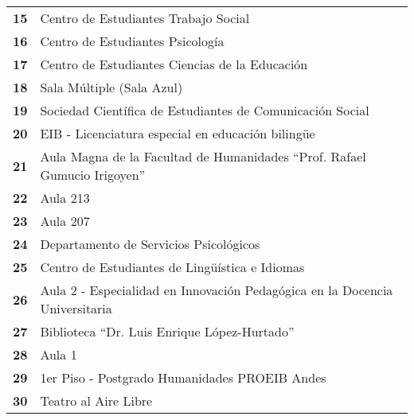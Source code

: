 \begin{longtable}{ c  X }
\textbf{15}
&
Centro de Estudiantes Trabajo Social
\\




\textbf{16}
&
Centro de Estudiantes Psicología
\\


\textbf{17}
&
Centro de Estudiantes Ciencias de la Educación
\\


\textbf{18}
&
Sala Múltiple (Sala Azul)
\\


      \textbf{19}
      &
        Sociedad Científica de Estudiantes de Comunicación Social
      \\


      \textbf{20}
      &
      EIB - Licenciatura especial en educación bilingüe
      \\


      \textbf{21}
      &
      Aula Magna de la Facultad de Humanidades ``Prof. Rafael Gumucio Irigoyen''
      \\


      \textbf{22}
      &
      Aula 213
      \\


      \textbf{23}
      &
      Aula 207
      \\


      \textbf{24}
      &
      Departamento de Servicios Psicológicos
      \\


      \textbf{25}
      &
      Centro de Estudiantes de Lingüística e Idiomas
      \\




      \textbf{26}
      &
      Aula 2 - Especialidad en Innovación Pedagógica en la Docencia Universitaria
      \\


      \textbf{27}
      &
      Biblioteca ``Dr. Luis Enrique López-Hurtado''
      \\


      \textbf{28}
      &
      Aula 1
      \\


      \textbf{29}
      &
      1{\tiny er} Piso - Postgrado Humanidades PROEIB Andes
      \\


      \textbf{30}
      &
      Teatro al Aire Libre
      \\




\end{longtable}
